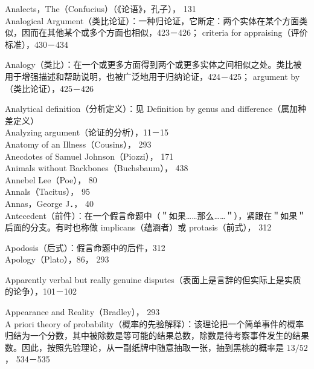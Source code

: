 Analects，The（Confucius）（《论语》，孔子）， 131\\
Analogical Argument（类比论证）：一种归论证，它断定：两个实体在某个方面类似，因而在其他某个或多个方面也相似，423－426； criteria for appraising（评价标准），430－434

Analogy（类比）：在一个或更多方面得到两个或更多实体之间相似之处。类比被用于增强描述和帮助说明，也被广泛地用于归纳论证，424－425； argument by（类比论证），425－426

Analytical definition（分析定义）：见 Definition by genus and difference（属加种差定义）\\
Analyzing argument（论证的分析），11－15\\
Anatomy of an Illness（Cousins）， 293\\
Anecdotes of Samuel Johnson（Piozzi）， 171\\
Animals without Backbones（Buchsbaum）， 438\\
Annebel Lee（Poe）， 80\\
Annals（Tacitus）， 95\\
Annas，George J．， 40\\
Antecedent（前件）：在一个假言命题中（＂如果……那么……＂），紧跟在＂如果＂后面的分支。有时也称做 implicans（蕴涵者）或 protasis（前式）， 312

Apodosis（后式）：假言命题中的后件，312\\
Apology（Plato），86， 293

Apparently verbal but really genuine disputes（表面上是言辞的但实际上是实质的论争），101－102

Appearance and Reality（Bradley）， 293\\
A priori theory of probability（概率的先验解释）：该理论把一个简单事件的概率归结为一个分数，其中被除数是等可能的结果总数，除数是待考察事件发生的结果数。因此，按照先验理论，从一副纸牌中随意抽取一张，抽到黑桃的概率是 $13 / 52$ ， 534－535

